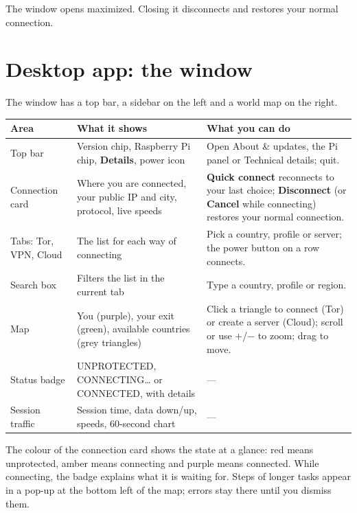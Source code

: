 \documentclass[11pt,a4paper]{article}
\newcommand{\ui}[1]{\textbf{#1}}            %
\begin{document}
The window opens maximized. Closing it disconnects and restores your normal connection.

\section{Desktop app: the window}

The window has a top bar, a sidebar on the left and a world map on the right.

\begin{center}
\begin{tabularx}{\linewidth}{@{}>{\raggedright\arraybackslash}p{3.2cm} L L@{}}
\toprule
\textbf{Area} & \textbf{What it shows} & \textbf{What you can do} \\
\midrule
Top bar & Version chip, Raspberry Pi chip, \ui{Details}, power icon & Open About \& updates, the Pi panel or Technical details; quit. \\
Connection card & Where you are connected, your public IP and city, protocol, live speeds & \ui{Quick connect} reconnects to your last choice; \ui{Disconnect} (or \ui{Cancel} while connecting) restores your normal connection. \\
Tabs: Tor, VPN, Cloud & The list for each way of connecting & Pick a country, profile or server; the power button on a row connects. \\
Search box & Filters the list in the current tab & Type a country, profile or region. \\
Map & You (purple), your exit (green), available countries (grey triangles) & Click a triangle to connect (Tor) or create a server (Cloud); scroll or use $+$/$-$ to zoom; drag to move. \\
Status badge & UNPROTECTED, CONNECTING\ldots{} or CONNECTED, with details & --- \\
Session traffic & Session time, data down/up, speeds, 60-second chart & --- \\
\bottomrule
\end{tabularx}
\end{center}

The colour of the connection card shows the state at a glance: red means unprotected, amber means connecting and purple means connected. While connecting, the badge explains what it is waiting for. Steps of longer tasks appear in a pop-up at the bottom left of the map; errors stay there until you dismiss them.
\end{document}
